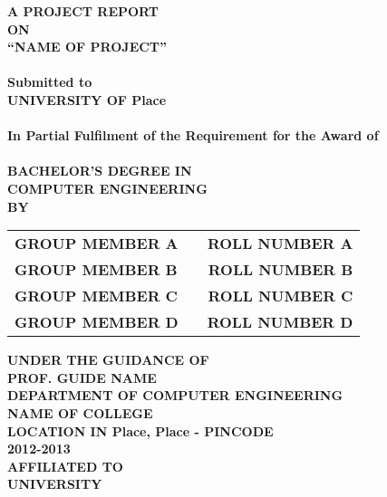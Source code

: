 \newpage
\begin{center}
\thispagestyle{empty}
\Large{\textbf{A PROJECT REPORT\\ \large{ON}}}\\[0.7cm]
\LARGE{\textsc {\textbf{``NAME OF PROJECT''}}}\\[0.5cm]
\vspace{0.5cm}
\Large{\textbf{\\Submitted to}}
\LARGE{\textbf{\\UNIVERSITY OF Place\\}}
\vspace{1cm}
\Large{\textbf{\\In Partial Fulfilment of the Requirement for the Award of\\}}
\Large{\textbf{\\BACHELOR'S DEGREE IN\\COMPUTER ENGINEERING}}
\vspace{1cm}
\Large{\textbf{\\BY}}\\[0.5cm]
\begin{table}[h]
\centering
\Large{
\begin{tabular}{>{\bfseries}lc>{\bfseries}r}
GROUP MEMBER A & & ROLL NUMBER A\\GROUP MEMBER B & & ROLL NUMBER B\\GROUP MEMBER C & & ROLL NUMBER C\\GROUP MEMBER D & & ROLL NUMBER D\\
\end{tabular}}
\end{table}
\vspace{0.5cm}
\large{\textbf{UNDER THE GUIDANCE OF}}\\
\large{\textbf{PROF. GUIDE NAME}}\\
\vspace{1cm}
\large{\textbf{DEPARTMENT OF COMPUTER ENGINEERING}}\\
\Large{\textbf{NAME OF COLLEGE}}\\
\large{\textbf{LOCATION IN Place, Place - PINCODE}}
\large{\textbf{\\2012-2013}}\\
\vspace{1cm}
\Large{\textbf{AFFILIATED TO\\}}
\LARGE{\textbf{UNIVERSITY }}
\newpage
\end{center}
